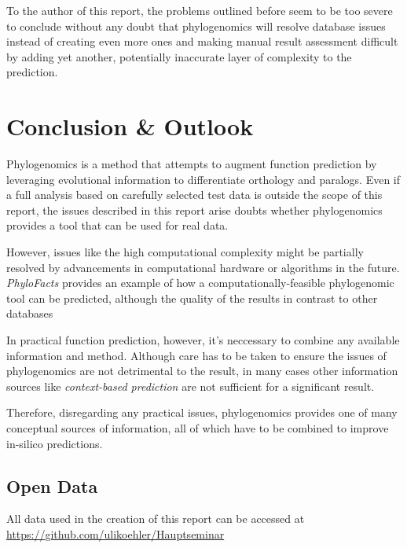 \documentclass[pdftex,paper=A4,DIV=calc,titlepage,12pt]{scrartcl}
\newtheorem[L]{boxedDefinition}{Definition}
\begin{document}
To the author of this report, the problems outlined before seem to be too severe to conclude without any doubt that phylogenomics will resolve database issues instead of creating even more ones and making manual result assessment difficult by adding yet another, potentially inaccurate layer of complexity to the prediction.

\section{Conclusion \& Outlook}

Phylogenomics is a method that attempts to augment function prediction by leveraging evolutional information to differentiate orthology and paralogs. Even if a full analysis based on carefully selected test data is outside the scope of this report, the issues described in this report arise doubts whether phylogenomics provides a tool that can be used for real data.

However, issues like the high computational complexity might be partially resolved by advancements in computational hardware or algorithms in the future. \textit{PhyloFacts} provides an example of how a computationally-feasible phylogenomic tool can be predicted, although the quality of the results in contrast to other databases

In practical function prediction, however, it's neccessary to combine any available information and method. Although care has to be taken to ensure the issues of phylogenomics are not detrimental to the result, in many cases other information sources like \textit{context-based prediction} are not sufficient for a significant result.

Therefore, disregarding any practical issues, phylogenomics provides one of many conceptual sources of information, all of which have to be combined to improve in-silico predictions.

\renewcommand\refname{Bibliography}


\subsection*{Open Data}\label{opendata}
All data used in the creation of this report can be accessed at\\\url{https://github.com/ulikoehler/Hauptseminar}
\end{document}
